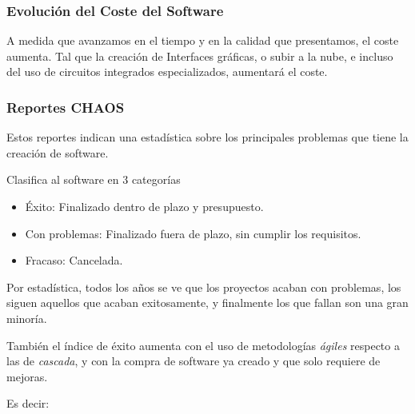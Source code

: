 \subsubsection{Evolución del Coste del Software}
\noindent A medida que avanzamos en el tiempo y en la calidad que presentamos, el coste aumenta. Tal que la creación de Interfaces gráficas, o subir a la nube, e incluso del uso de circuitos integrados especializados, aumentará el coste.
\subsubsection{Reportes CHAOS}
\noindent Estos reportes indican una estadística sobre los principales problemas que tiene la creación de software.
\par \noindent Clasifica al software en 3 categorías
\begin{itemize}
        \color{green}\item \color{black} Éxito: Finalizado dentro de plazo y presupuesto.
              \color{yellow}\item \color{black}
              Con problemas: Finalizado fuera de plazo, sin cumplir los requisitos.
              \color{red}\item \color{black}
              Fracaso: Cancelada.
\end{itemize}
\noindent Por estadística, todos los años se ve que los proyectos acaban \color{yellow}con problemas\color{black}, los siguen aquellos que \color{green}acaban exitosamente\color{black}, y finalmente los que \color{red}fallan \color{black} son una gran minoría.
\par \noindent También el índice de éxito aumenta con el uso de metodologías \textit{ágiles} respecto a las de \textit{cascada}, y con la compra de software ya creado y que solo requiere de mejoras.
\par \noindent Es decir:
